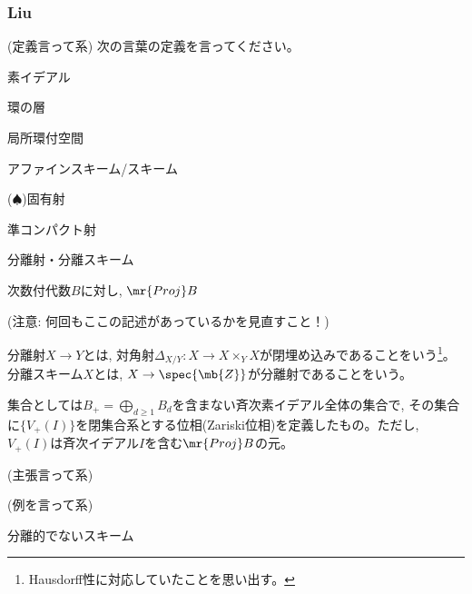 \subsubsection{Liu}
\begin{egprob} (定義言って系)
次の言葉の定義を言ってください。
\ben 
\item 素イデアル
\item 環の層
\item 局所環付空間
\item アファインスキーム/スキーム
\item ($\spadesuit$)固有射
\item 準コンパクト射
\item 分離射・分離スキーム
\item 次数付代数$B$に対し, $\mr{Proj}B$
\een
\end{egprob}
\begin{egans}
(注意: 何回もここの記述があっているかを見直すこと！)
\ben
\item
\item
\item
\item
\item
\item 分離射$X\to Y$とは, 対角射$\Delta_{X/Y}:X\to X\times_{Y} X$が閉埋め込みであることをいう\footnote{Hausdorff性に対応していたことを思い出す。}。分離スキーム$X$とは, $X\to \spec{\mb{Z}}$が分離射であることをいう。
\item 集合としては$B_{+} = \bigoplus_{d\geq 1} B_{d}$を含まない斉次素イデアル全体の集合で, その集合に$\{ V_{+}(I) \}$を閉集合系とする位相(Zariski位相)を定義したもの。ただし, $V_{+}(I)$は斉次イデアル$I$を含む$\mr{Proj}B$の元。
\een
\end{egans}

\begin{egprob} (主張言って系)
\ben
\item 
\een
\end{egprob}

\begin{egprob} (例を言って系) 
\ben
\item 分離的でないスキーム
\een
\end{egprob}

\begin{egans}

\end{egans}


\onecolumn
